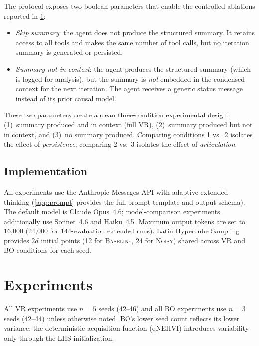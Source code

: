 \documentclass[11pt,letterpaper]{article}
\newcommand{\oracle}[1]{\textsc{#1}}
\newcommand{\baseline}{\oracle{Baseline}}
\newcommand{\noisy}{\oracle{Noisy}}
\begin{document}
The protocol exposes two boolean parameters that enable the controlled
ablations reported in \cref{sec:experiments}:

\begin{itemize}
  \item \emph{Skip summary}: the agent does not produce the structured
  summary. It retains access to all tools and makes the same number of
  tool calls, but no iteration summary is generated or persisted.
  \item \emph{Summary not in context}: the agent produces the structured
  summary (which is logged for analysis), but the summary is \emph{not}
  embedded in the condensed context for the next iteration. The agent
  receives a generic status message instead of its prior causal model.
\end{itemize}

These two parameters create a clean three-condition experimental design:
(1)~summary produced and in context (full VR), (2)~summary produced but
not in context, and (3)~no summary produced. Comparing conditions 1
vs.~2 isolates the effect of \emph{persistence}; comparing 2 vs.~3
isolates the effect of \emph{articulation}.

\subsection{Implementation}

All experiments use the Anthropic Messages API with adaptive extended
thinking (\cref{app:prompt} provides the full prompt template and output
schema). The default model is Claude Opus~4.6; model-comparison
experiments additionally use Sonnet~4.6 and Haiku~4.5. Maximum output
tokens are set to 16{,}000 (24{,}000 for 144-evaluation extended runs).
Latin Hypercube Sampling provides $2d$ initial points (12 for \baseline{},
24 for \noisy{}) shared across VR and BO conditions for each seed.

\section{Experiments}
\label{sec:experiments}

All VR experiments use $n = 5$ seeds (42--46) and all BO experiments use
$n = 3$ seeds (42--44) unless otherwise noted. BO's lower seed count
reflects its lower variance: the deterministic acquisition function
(qNEHVI) introduces variability only through the LHS initialization.
\end{document}
